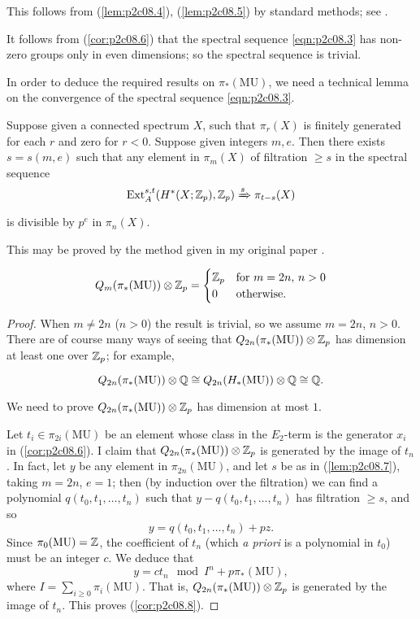\documentclass[../main]{subfiles}
\begin{document}
This follows from (\ref{lem:p2c08.4}), (\ref{lem:p2c08.5}) by standard methods; see \cite{milnor2}.

It follows from (\ref{cor:p2c08.6}) that the spectral sequence \eqref{eqn:p2c08.3} has non-zero groups only in even dimensions; so the spectral sequence is trivial.

In order to deduce the required results on $\pi_\ast(\mathrm{MU})$, we need a technical lemma on the convergence of the spectral sequence \eqref{eqn:p2c08.3}.

\begin{lemma}
\label{lem:p2c08.7}
Suppose given a connected spectrum $X$, such that $\pi_r(X)$ is finitely generated for each $r$ and zero for $r < 0$. Suppose given integers $m, e$. Then there exists $s = s(m, e)$ such that any element in $\pi_m(X)$ of filtration $\ge s$ in the spectral sequence \[\mathrm{Ext}_A^{s, t}(H^\ast(X; \mathbb{Z}_p), \mathbb{Z}_p) \xRightarrow{s} \pi_{t - s}(X)\] is divisible by $p^e$ in $\pi_n(X)$.
\end{lemma}

This may be proved by the method given in my original paper \cite{adams}.

\begin{corollary}
\label{cor:p2c08.8}
\[Q_m(\pi_\ast(\mathrm{MU})) \otimes \mathbb{Z}_p = \begin{cases}\mathbb{Z}_p & \text {for } m = 2n, \, n > 0 \\ 0 & \text{otherwise}.\end{cases}\] 
\end{corollary}

\begin{proof}
When $m \ne 2n$ ($n > 0$) the result is trivial, so we assume $m = 2n$, $n > 0$. There are of course many ways of seeing that $Q_{2n}(\pi_\ast(\mathrm{MU})) \otimes \mathbb{Z}_p$ has dimension at least one over $\mathbb{Z}_p$; for example, 

\[Q_{2n}(\pi_\ast(\mathrm{MU})) \otimes \mathbb{Q} \cong Q_{2n}(H_\ast(\mathrm{MU})) \otimes \mathbb{Q} \cong \mathbb{Q}.\]

We need to prove $Q_{2n}(\pi_\ast(\mathrm{MU})) \otimes \mathbb{Z}_p$ has dimension at most $1$.

Let $t_i \in \pi_{2i}(\mathrm{MU})$ be an element whose class in the $E_2$-term is the generator $x_i$ in (\ref{cor:p2c08.6}). I claim that $Q_{2n}(\pi_\ast(\mathrm {MU})) \otimes \mathbb{Z}_p$ is generated by the image of $t_n$. In fact, let $y$ be any element in $\pi_{2n}(\mathrm {MU})$, and let $s$ be as in (\ref{lem:p2c08.7}), taking $m = 2n$, $e = 1$; then (by induction over the filtration) we can find a polynomial $q(t_0, t_1, \ldots, t_n)$ such that $y - q(t_0, t_1, \ldots, t_n)$ has filtration $\ge s$, and so \[y = q(t_0, t_1, \ldots, t_n) + p z.\] Since $\pi_0(\mathrm{MU}) = \mathbb{Z}$, the coefficient of $t_n$ (which \emph{a priori} is a polynomial in $t_0$) must be an integer $c$. We deduce that \[y = c t_n \mod I^n + p \pi_\ast(\mathrm{MU}),\] where $\displaystyle I = \sum_{i \ge 0} \pi_i(\mathrm{MU}).$ That is, $Q_{2n}(\pi_\ast(\mathrm{MU})) \otimes \mathbb{Z}_p$ is generated by the image of $t_n$. This proves (\ref{cor:p2c08.8}).
\end{proof}
\end{document}
